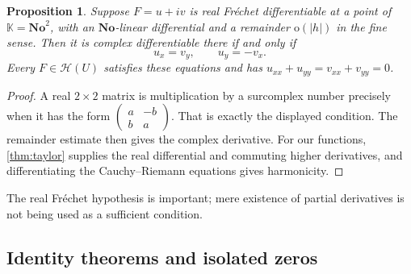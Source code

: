\documentclass[11pt,letterpaper]{article}
\numberwithin{equation}{section}
\newtheorem{proposition}[theorem]{Proposition}
\theoremstyle{definition}
\theoremstyle{remark}
\newcommand{\No}{\mathbf{No}}
\newcommand{\K}{\mathbb{K}}
\newcommand{\HH}{\mathcal{H}}
\newcommand{\smallo}{\mathrm{o}}
\begin{document}
\begin{proposition}\label{prop:CR}
Suppose $F=u+iv$ is real Fr\'echet differentiable at a point of $\K=\No^2$,
with an $\No$-linear differential and a remainder $\smallo(|h|)$ in the fine
sense. Then it is complex differentiable there if and only if
\[
 u_x=v_y,\qquad u_y=-v_x.
\]
Every $F\in\HH(U)$ satisfies these equations and has
$u_{xx}+u_{yy}=v_{xx}+v_{yy}=0$.
\end{proposition}
\begin{proof}
A real $2\times2$ matrix is multiplication by a surcomplex number precisely
when it has the form
$\left(\begin{smallmatrix}a&-b\\b&a\end{smallmatrix}\right)$.
That is exactly the displayed condition. The remainder estimate then gives
the complex derivative. For our functions, \cref{thm:taylor} supplies the
real differential and commuting higher derivatives, and differentiating the
Cauchy--Riemann equations gives harmonicity.
\end{proof}
The real Fr\'echet hypothesis is important; mere existence of partial
derivatives is not being used as a sufficient condition.

\subsection{Identity theorems and isolated zeros}
\end{document}
